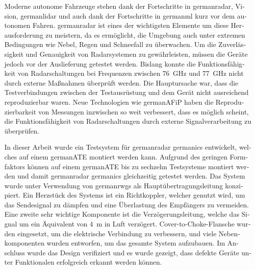 \cleardoubleoddpage%
\begin{otherlanguage}{ngerman}
\begin{abstract*}
	Moderne autonome Fahrzeuge stehen dank der Fortschritte in \gls{germanradar}, Vision, \gls*{germanlidar} und auch dank der Fortschritte in \gls{germanml} kurz vor dem autonomen Fahren. 
	\Gls{germanradar} ist eines der wichtigsten Elemente um diese Herausforderung zu meistern, da es ermöglicht, die Umgebung auch unter extremen Bedingungen wie Nebel, Regen und Schneefall zu überwachen. 
	Um die Zuverlässigkeit und Genauigkeit von Radarsystemen zu gewährleisten, müssen die Geräte jedoch vor der Auslieferung getestet werden.
	Bislang konnte die Funktionsfähigkeit von Radarschaltungen bei Frequenzen zwischen \SI{76}{\giga\hertz} und \SI{77}{\giga\hertz} nicht durch externe Maßnahmen überprüft werden.
	Die Hauptursache war, dass die Testverbindungen zwischen der Testausrüstung und dem Gerät nicht ausreichend reproduzierbar waren.
	Neue Technologien wie \gls{germanAFiP} haben die Reproduzierbarkeit von Messungen inzwischen so weit verbessert, dass es möglich scheint, 
	die Funktionsfähigkeit von Radarschaltungen durch externe Signalverarbeitung zu überprüfen.

	In dieser Arbeit wurde ein Testsystem für \gls{germanradar} \glspl{germanic} entwickelt, welches auf einem \gls{germanATE} montiert werden kann.  
	Aufgrund des geringen Formfaktors können auf einem \gls{germanATE} bis zu sechzehn Testsysteme montiert werden und damit \gls{germanradar} \glspl{germanic} gleichzeitig getestet werden. 
	Das System wurde unter Verwendung von \glspl{germanrwg} als Hauptübertragungsleitung konzipiert. 
	Ein Herzstück des Systems ist ein Richtkoppler, welcher genutzt wird, um das Sendesignal zu dämpfen und eine Überlastung des Empfängers zu vermeiden. 
	Eine zweite sehr wichtige Komponente ist die Verzögerungsleitung, welche das Signal um ein Äquivalent von \SI{4}{\meter} in Luft verzögert. 
	Cover-to-Choke-Flansche wurden eingesetzt, um die elektrische Verbindung zu verbessern, und viele Nebenkomponenten wurden entworfen, um das gesamte System aufzubauen. 
	Im Anschluss wurde das Design verifiziert und es wurde gezeigt, dass defekte Geräte unter Funktionalen erfolgreich erkannt werden können.
\end{abstract*}
\end{otherlanguage}
